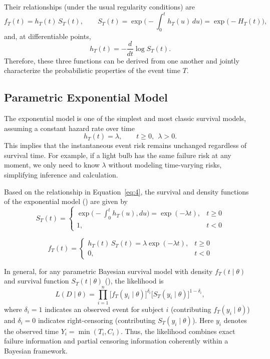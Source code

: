 Their relationships (under the usual regularity conditions) are
\begin{equation}
    f_T(t)=h_T(t)\,S_T(t),\qquad
S_T(t)=\exp\!\Big(-\!\int_0^{t} h_T(u)\,du\Big)=\exp\!\big(-H_T(t)\big),
\label{eq:4}
\end{equation}
and, at differentiable points,
\begin{equation}
    h_T(t)=-\frac{d}{dt}\log S_T(t).
\end{equation}
Therefore, these three functions can be derived from one another and jointly characterize the probabilistic properties of the event time $T$.





\subsection{Parametric Exponential Model} \label{Exponential Model}
The exponential model is one of the simplest and most classic survival models, assuming a constant hazard rate over time
\begin{equation}
h_T(t)=\lambda,\qquad t\ge 0,\ \ \lambda>0 .
\end{equation}
This implies that the instantaneous event risk remains unchanged regardless of survival time. For example, if a light bulb has the same failure risk at any moment, we only need to know $\lambda$ without modeling time-varying risks, simplifying inference and calculation.

Based on the relationship in Equation~\eqref{eq:4}, the survival and density functions of the exponential model (\cite{ibrahim2013bayesian}) are given by
\begin{equation}
S_T(t) =
\begin{cases}
\exp\Big( -\displaystyle\int_0^t h_T(u), du \Big)=\exp(-\lambda t), & t \ge 0 \\
1, & t < 0
\end{cases}
\end{equation}

\begin{equation}
f_T(t) =
\begin{cases}
h_T(t)\, S_T(t)=\lambda \exp(-\lambda t), & t \ge 0 \\
0, & t < 0
\end{cases}
\end{equation}

In general, for any parametric Bayesian survival model with density $f_T(t\mid\theta)$ and survival function $S_T(t\mid\theta)$ (\cite{ibrahim2013bayesian}), the likelihood is
\begin{equation}
L( D \mid \theta)
= \prod_{i=1}^n
\big[ f_T(y_i \mid \theta) \big]^{\delta_i}
\big[ S_T(y_i \mid \theta) \big]^{1 - \delta_i},
\label{eq:8}
\end{equation}
where $\delta_i=1$ indicates an observed event for subject $i$ (contributing $f_T(y_i\mid\theta)$) and $\delta_i=0$ indicates right-censoring (contributing $S_T(y_i\mid\theta)$). Here $y_i$ denotes the observed time $Y_i=\min(T_i,C_i)$. Thus, the likelihood combines exact failure information and partial censoring information coherently within a Bayesian framework.

